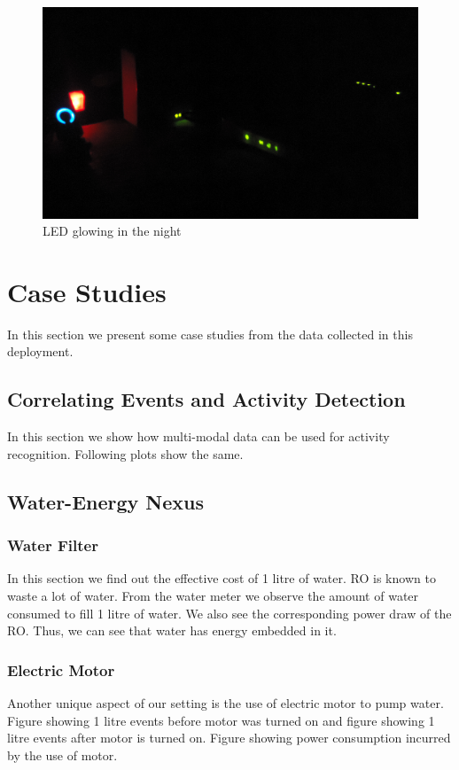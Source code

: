 \documentclass[10pt]{sensys-proc}
\begin{document}
\begin{figure}     
    \includegraphics[scale=0.04]{./figures/led.JPG}    
    \caption{LED glowing in the night}   
    \label{fig:led}
   
\end{figure}

\section{Case Studies}
In this section we present some case studies from the data collected in this deployment.
\subsection{Correlating Events and Activity Detection}
In this section we show how multi-modal data can be used for activity recognition. Following plots show the same.


\subsection{Water-Energy Nexus}
\subsubsection{Water Filter}
In this section we find out the effective cost of 1 litre of water. RO is known to waste a lot of water. From the water meter we observe the amount of water consumed to fill 1 litre of water. We also see the corresponding power draw of the RO. Thus, we can see that water has energy embedded in it.

\subsubsection{Electric Motor}
Another unique aspect of our setting is the use of electric motor to pump water. Figure showing 1 litre events before motor was turned on and figure showing 1 litre events after motor is turned on.
Figure showing power consumption incurred by the use of motor.
\end{document}
